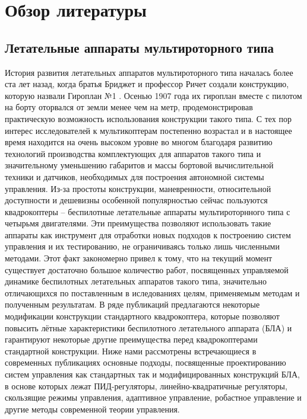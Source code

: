

\chapter{Обзор литературы} \label{review}
\section{Летательные аппараты мультироторного типа} \label{review_s1}

История развития летательных аппаратов мультироторного типа началась более ста лет назад, когда братья Бриджет и профессор Ричет создали конструкцию, которую назвали Гироплан №1 \cite{Leishman02, Leishman01}. Осенью 1907 года их гироплан вместе с пилотом на борту оторвался от земли менее чем на метр, продемонстрировав практическую возможность использования конструкции такого типа. С тех пор интерес исследователей к мультикоптерам постепенно возрастал и в настоящее время находится на очень высоком уровне во многом благодаря развитию технологий производства комплектующих для аппаратов такого типа и значительному уменьшению габаритов и массы бортовой вычислительной техники и датчиков, необходимых для построения автономной системы управления. Из-за простоты конструкции, маневренности, относительной доступности и дешевизны особенной популярностью сейчас пользуются квадрокоптеры -- беспилотные летательные аппараты мультироторнного типа с четырьмя двигателями. Эти преимущества позволяют использовать такие аппараты как инструмент для отработки новых подходов к построению систем управления и их тестированию, не ограничиваясь только лишь численными методами. Этот факт закономерно привел к тому, что на текущий момент существует достаточно большое количество работ, посвященных управляемой динамике беспилотных летательных аппаратов такого типа, значительно отличающихся по поставленным в иследованиях целям, применяемым методам и полученным результатам. В ряде публикаций предлагаются некоторые модификации конструкции стандартного квадрокоптера, которые позволяют повысить лётные характеристики беспилотного летательного аппарата (БЛА) и гарантируют некоторые другие преимущества перед квадрокоптерами стандартной конструкции. Ниже нами рассмотрены встречающиеся в современных публикациях основные подходы, посвященные проектированию систем управления как стандартных так и модифицированных конструкций БЛА, в основе которых лежат ПИД-регуляторы, линейно-квадратичные регуляторы, скользящие режимы управления, адаптивное управление, робастное управление и другие методы современной теории управления.

